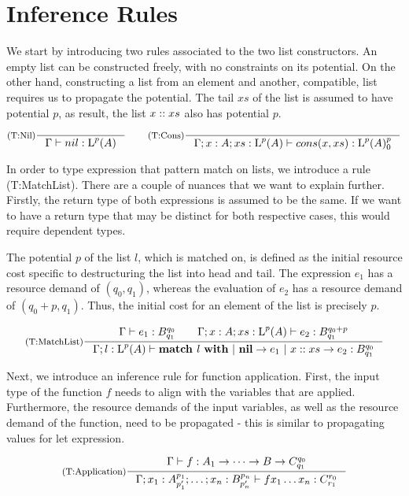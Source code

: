 \section{Inference Rules}

We start by introducing two rules associated to the two list constructors. An empty list can be constructed freely, with no constraints on its potential. On the other hand, constructing a list from an element and another, compatible, list requires us to propagate the potential. The tail \(xs\) of the list is assumed to have potential \(p\), as result, the list \(x :: xs\) also has potential \(p\). 

\[
   \inference[(T:Nil)]
   {}
   {\typing{\Gamma}{nil}{\ralist{p}{A}}}
   \qquad
   \inference[(T:Cons)]
   {}
   {\typing{\Gamma;x : A; xs : \ralist{p}{A}}{cons(x, xs)}{\ratype{\ralist{p}{A}}{p}{0}}}
\]

In order to type expression that pattern match on lists, we introduce a rule (T:MatchList). There are a couple of nuances that we want to explain further. Firstly, the return type of both expressions is assumed to be the same. If we want to have a return type that may be distinct for both respective cases, this would require dependent types. 

The potential \(p\) of the list \(l\), which is matched on, is defined as the initial resource cost specific to destructuring the list into head and tail. The expression \(e_1\) has a resource demand of \((q_0, q_1)\), whereas the evaluation of \(e_2\) has a resource demand of \((q_0 + p, q_1)\). Thus, the initial cost for an element of the list is precisely \(p\).  

\[
   \inference[(T:MatchList)]
   {\typing{\Gamma}{e_1}{\ratype{B}{q_0}{q_1}} \qquad \typing{\Gamma;x : A; xs : \ralist{p}{A}}{e_2}{\ratype{B}{q_0 + p}{q_1}}}
   {\typing{\Gamma;l : \ralist{p}{A}}{\listmatch{l}{e_1}{e_2}}{\ratype{B}{q_0}{q_1}}}
\]

Next, we introduce an inference rule for function application. First, the input type of the function \(f\) needs to align with the variables that are applied. Furthermore, the resource demands of the input variables, as well as the resource demand of the function, need to be propagated - this is similar to propagating values for let expression. 

\[
   \inference[(T:Application)]
   {\typing{\Gamma}{f}{A_1 \to \dots \to B \to \ratype{C}{q_0}{q_1}}}
   {\typing{\Gamma;x_1:\ratype{A}{p_1}{p_1'};\dots;x_n:\ratype{B}{p_n}{p_n'}}{f x_1 \dots x_n}{\ratype{C}{r_0}{r_1}}}
\]


